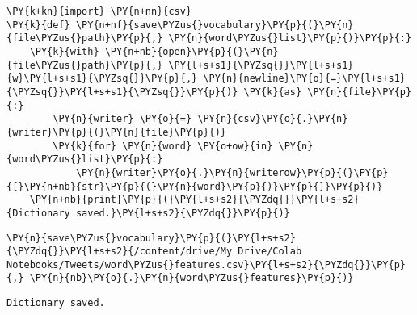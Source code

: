 \documentclass[11pt]{article}
\begin{document}
    \begin{tcolorbox}[breakable, size=fbox, boxrule=1pt, pad at break*=1mm,colback=cellbackground, colframe=cellborder]
\begin{Verbatim}[commandchars=\\\{\}]
\PY{k+kn}{import} \PY{n+nn}{csv}
\PY{k}{def} \PY{n+nf}{save\PYZus{}vocabulary}\PY{p}{(}\PY{n}{file\PYZus{}path}\PY{p}{,} \PY{n}{word\PYZus{}list}\PY{p}{)}\PY{p}{:}
    \PY{k}{with} \PY{n+nb}{open}\PY{p}{(}\PY{n}{file\PYZus{}path}\PY{p}{,} \PY{l+s+s1}{\PYZsq{}}\PY{l+s+s1}{w}\PY{l+s+s1}{\PYZsq{}}\PY{p}{,} \PY{n}{newline}\PY{o}{=}\PY{l+s+s1}{\PYZsq{}}\PY{l+s+s1}{\PYZsq{}}\PY{p}{)} \PY{k}{as} \PY{n}{file}\PY{p}{:}
        \PY{n}{writer} \PY{o}{=} \PY{n}{csv}\PY{o}{.}\PY{n}{writer}\PY{p}{(}\PY{n}{file}\PY{p}{)}
        \PY{k}{for} \PY{n}{word} \PY{o+ow}{in} \PY{n}{word\PYZus{}list}\PY{p}{:}
            \PY{n}{writer}\PY{o}{.}\PY{n}{writerow}\PY{p}{(}\PY{p}{[}\PY{n+nb}{str}\PY{p}{(}\PY{n}{word}\PY{p}{)}\PY{p}{]}\PY{p}{)}
    \PY{n+nb}{print}\PY{p}{(}\PY{l+s+s2}{\PYZdq{}}\PY{l+s+s2}{Dictionary saved.}\PY{l+s+s2}{\PYZdq{}}\PY{p}{)}
\end{Verbatim}
\end{tcolorbox}

    \begin{tcolorbox}[breakable, size=fbox, boxrule=1pt, pad at break*=1mm,colback=cellbackground, colframe=cellborder]
\begin{Verbatim}[commandchars=\\\{\}]
\PY{n}{save\PYZus{}vocabulary}\PY{p}{(}\PY{l+s+s2}{\PYZdq{}}\PY{l+s+s2}{/content/drive/My Drive/Colab Notebooks/Tweets/word\PYZus{}features.csv}\PY{l+s+s2}{\PYZdq{}}\PY{p}{,} \PY{n}{nb}\PY{o}{.}\PY{n}{word\PYZus{}features}\PY{p}{)}
\end{Verbatim}
\end{tcolorbox}

    \begin{Verbatim}[commandchars=\\\{\}]
Dictionary saved.
    \end{Verbatim}


    
    
    
\end{document}

